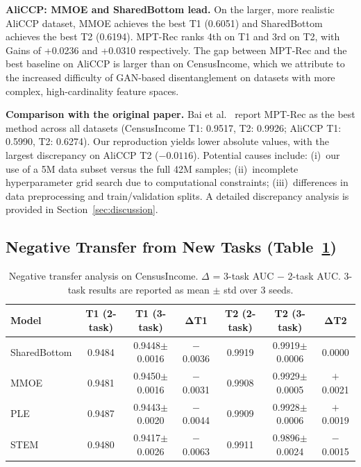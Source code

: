 \documentclass[review,anonymous]{acmart}
\begin{document}
\textbf{AliCCP: MMOE and SharedBottom lead.} On the larger, more realistic
AliCCP dataset, MMOE achieves the best T1 (0.6051) and SharedBottom achieves the
best T2 (0.6194). MPT-Rec ranks 4th on T1 and 3rd on T2, with Gains of +0.0236
and +0.0310 respectively. The gap between MPT-Rec and the best baseline on AliCCP
is larger than on CensusIncome, which we attribute to the increased difficulty of
GAN-based disentanglement on datasets with more complex, high-cardinality feature
spaces.

\textbf{Comparison with the original paper.} Bai et al.~\cite{bai2025efficient}
report MPT-Rec as the best method across all datasets (CensusIncome T1: 0.9517,
T2: 0.9926; AliCCP T1: 0.5990, T2: 0.6274). Our reproduction yields lower
absolute values, with the largest discrepancy on AliCCP T2 ($-0.0116$). Potential
causes include: (i)~our use of a 5M data subset versus the full 42M samples;
(ii)~incomplete hyperparameter grid search due to computational constraints;
(iii)~differences in data preprocessing and train/validation splits. A detailed
discrepancy analysis is provided in Section~\ref{sec:discussion}.

\subsection{Negative Transfer from New Tasks (Table~\ref{tab:negative_transfer})}

\begin{table}[t]
  \centering
  \caption{Negative transfer analysis on CensusIncome. $\Delta$ = 3-task AUC $-$ 2-task AUC.
           3-task results are reported as mean $\pm$ std over 3 seeds.}
  \label{tab:negative_transfer}
  \begin{tabular}{lcccccc}
    \toprule
    \textbf{Model} & \textbf{T1 (2-task)} & \textbf{T1 (3-task)} & $\boldsymbol{\Delta}$\textbf{T1}
                    & \textbf{T2 (2-task)} & \textbf{T2 (3-task)} & $\boldsymbol{\Delta}$\textbf{T2} \\
    \midrule
    SharedBottom & 0.9484 & 0.9448$\pm$0.0016 & $-$0.0036 & 0.9919 & 0.9919$\pm$0.0006 & 0.0000 \\
    MMOE         & 0.9481 & 0.9450$\pm$0.0016 & $-$0.0031 & 0.9908 & 0.9929$\pm$0.0005 & $+$0.0021 \\
    PLE          & 0.9487 & 0.9443$\pm$0.0020 & $-$0.0044 & 0.9909 & 0.9928$\pm$0.0006 & $+$0.0019 \\
    STEM         & 0.9480 & 0.9417$\pm$0.0026 & $-$0.0063 & 0.9911 & 0.9896$\pm$0.0024 & $-$0.0015 \\
    \bottomrule
  \end{tabular}
\end{table}
\end{document}
